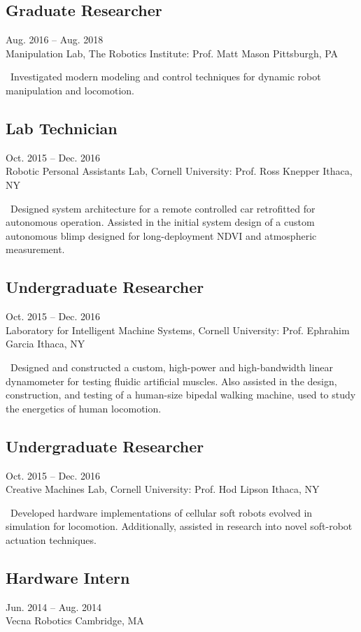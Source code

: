 \documentclass[]{article}
\begin{document}
\subsection*{Graduate Researcher} \hfill Aug. 2016 -- Aug. 2018 \\
Manipulation Lab, The Robotics Institute: Prof. Matt Mason \hfill Pittsburgh, PA

\textellipsis~Investigated modern modeling and control techniques for dynamic robot manipulation and locomotion.

\subsection*{Lab Technician} \hfill Oct. 2015 -- Dec. 2016 \\
Robotic Personal Assistants Lab, Cornell University: Prof. Ross Knepper \hfill Ithaca, NY

\textellipsis~Designed system architecture for a remote controlled car retrofitted for autonomous operation. Assisted in the initial system design of a custom autonomous blimp designed for long-deployment NDVI and atmospheric measurement.

\subsection*{Undergraduate Researcher} \hfill Oct. 2015 -- Dec. 2016 \\
Laboratory for Intelligent Machine Systems, Cornell University: Prof. Ephrahim Garcia \hfill Ithaca, NY

\textellipsis~Designed and constructed a custom, high-power and high-bandwidth linear dynamometer for testing fluidic artificial muscles. Also assisted in the design, construction, and testing of a human-size bipedal walking machine, used to study the energetics of human locomotion.

\subsection*{Undergraduate Researcher} \hfill Oct. 2015 -- Dec. 2016 \\
Creative Machines Lab, Cornell University: Prof. Hod Lipson \hfill Ithaca, NY

\textellipsis~Developed hardware implementations of cellular soft robots evolved in simulation for locomotion. Additionally, assisted in research into novel soft-robot actuation techniques.

\subsection*{Hardware Intern} \hfill Jun. 2014 -- Aug. 2014 \\
Vecna Robotics \hfill Cambridge, MA
\end{document}
